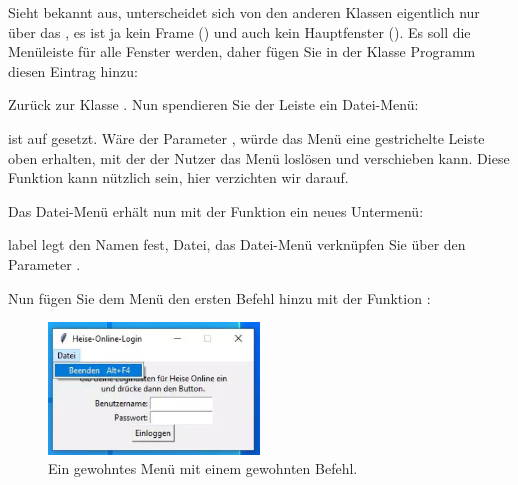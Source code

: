 
\medskip
	           
Sieht bekannt aus, unterscheidet sich von den anderen Klassen eigentlich nur über das , es ist ja kein Frame () und auch kein Hauptfenster (). Es soll die Menüleiste für alle Fenster werden, daher fügen Sie in der Klasse Programm diesen Eintrag hinzu:

\medskip


\medskip

Zurück zur Klasse . Nun spendieren Sie der Leiste ein Datei-Menü:

\medskip


\medskip

 ist auf  gesetzt. Wäre der Parameter , würde das Menü eine gestrichelte Leiste oben erhalten, mit der der Nutzer das Menü loslösen und verschieben kann. Diese Funktion kann nützlich sein, hier verzichten wir darauf.

Das Datei-Menü erhält nun mit der Funktion  ein neues Untermenü:

\medskip


\medskip

label legt den Namen fest, Datei, das Datei-Menü verknüpfen Sie über den Parameter .

Nun fügen Sie dem Menü den ersten Befehl hinzu mit der Funktion :

\medskip



\medskip

\begin{figure}
    \includegraphics[width=0.5\textwidth]{Images/TKinter/TkinterMenu}
    \caption{Ein gewohntes Menü mit einem gewohnten Befehl.} \label{TkinterMenu}
\end{figure}

